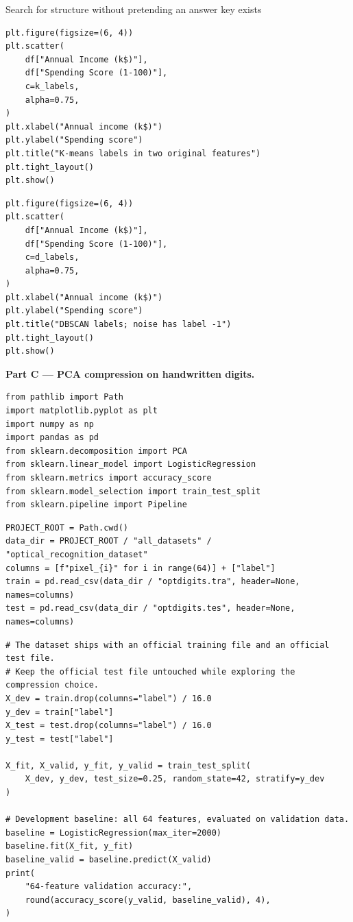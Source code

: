 \begin{labproject}{Search for structure without pretending an answer key exists}
\begin{lstlisting}[style=mlpython]
plt.figure(figsize=(6, 4))
plt.scatter(
    df["Annual Income (k$)"],
    df["Spending Score (1-100)"],
    c=k_labels,
    alpha=0.75,
)
plt.xlabel("Annual income (k$)")
plt.ylabel("Spending score")
plt.title("K-means labels in two original features")
plt.tight_layout()
plt.show()
\end{lstlisting}

\begin{lstlisting}[style=mlpython]
plt.figure(figsize=(6, 4))
plt.scatter(
    df["Annual Income (k$)"],
    df["Spending Score (1-100)"],
    c=d_labels,
    alpha=0.75,
)
plt.xlabel("Annual income (k$)")
plt.ylabel("Spending score")
plt.title("DBSCAN labels; noise has label -1")
plt.tight_layout()
plt.show()
\end{lstlisting}

\medskip\noindent\textbf{Part C --- PCA compression on handwritten digits.}\par
\begin{lstlisting}[style=mlpython]
from pathlib import Path
import matplotlib.pyplot as plt
import numpy as np
import pandas as pd
from sklearn.decomposition import PCA
from sklearn.linear_model import LogisticRegression
from sklearn.metrics import accuracy_score
from sklearn.model_selection import train_test_split
from sklearn.pipeline import Pipeline
\end{lstlisting}

\begin{lstlisting}[style=mlpython]
PROJECT_ROOT = Path.cwd()
data_dir = PROJECT_ROOT / "all_datasets" / "optical_recognition_dataset"
columns = [f"pixel_{i}" for i in range(64)] + ["label"]
train = pd.read_csv(data_dir / "optdigits.tra", header=None, names=columns)
test = pd.read_csv(data_dir / "optdigits.tes", header=None, names=columns)
\end{lstlisting}

\begin{lstlisting}[style=mlpython]
# The dataset ships with an official training file and an official test file.
# Keep the official test file untouched while exploring the compression choice.
X_dev = train.drop(columns="label") / 16.0
y_dev = train["label"]
X_test = test.drop(columns="label") / 16.0
y_test = test["label"]

X_fit, X_valid, y_fit, y_valid = train_test_split(
    X_dev, y_dev, test_size=0.25, random_state=42, stratify=y_dev
)

# Development baseline: all 64 features, evaluated on validation data.
baseline = LogisticRegression(max_iter=2000)
baseline.fit(X_fit, y_fit)
baseline_valid = baseline.predict(X_valid)
print(
    "64-feature validation accuracy:",
    round(accuracy_score(y_valid, baseline_valid), 4),
)
\end{lstlisting}


\end{labproject}
